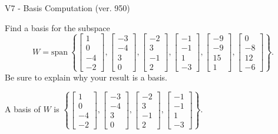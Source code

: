 \begin{exercise}
  \begin{exerciseTitle}V7 - Basis Computation (ver. 950)\end{exerciseTitle}
  \begin{exerciseStatement}
    Find a basis for the subspace 
\[W=\mathrm{span}\ \left\{\left[\begin{array}{r}
1 \\
0 \\
-4 \\
-2
\end{array}\right] , \left[\begin{array}{r}
-3 \\
-4 \\
3 \\
0
\end{array}\right] , \left[\begin{array}{r}
-2 \\
3 \\
-1 \\
2
\end{array}\right] , \left[\begin{array}{r}
-1 \\
-1 \\
1 \\
-3
\end{array}\right] , \left[\begin{array}{r}
-9 \\
-9 \\
15 \\
1
\end{array}\right] , \left[\begin{array}{r}
0 \\
-8 \\
12 \\
-6
\end{array}\right]\right\}.\]
 Be sure to explain why your result is a basis.


  \end{exerciseStatement}
  \begin{exerciseAnswer}
   A basis of \(W\) is  \(\left\{\left[\begin{array}{r}
1 \\
0 \\
-4 \\
-2
\end{array}\right] , \left[\begin{array}{r}
-3 \\
-4 \\
3 \\
0
\end{array}\right] , \left[\begin{array}{r}
-2 \\
3 \\
-1 \\
2
\end{array}\right] , \left[\begin{array}{r}
-1 \\
-1 \\
1 \\
-3
\end{array}\right]\right\}\).
  


  \end{exerciseAnswer}
\end{exercise}